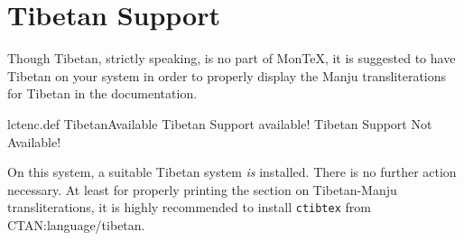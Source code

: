 \documentclass[11pt,a4paper]{article}
\begin{document}
\section{Tibetan Support}

Though Tibetan, strictly speaking, is no part of Mon\TeX, it is
suggested to have Tibetan on your system in order to properly
display the Manju transliterations for Tibetan in the documentation.

\PackageDiagnostics%
	{lctenc.def}				%
	{TibetanAvailable}			%
	{Tibetan Support available!}		%
	{Tibetan Support Not Available!}	%

\ifnum{}
	On this system, a suitable Tibetan system  \textit{is} installed.
	There is no further action necessary.
\else
	At least for properly printing the section on Tibetan-Manju
	\marginpar{\huge!!!}
	transliterations, it is highly recommended to install
	\texttt{ctibtex} from CTAN:language/tibetan.
\fi


\fi
\end{document}
